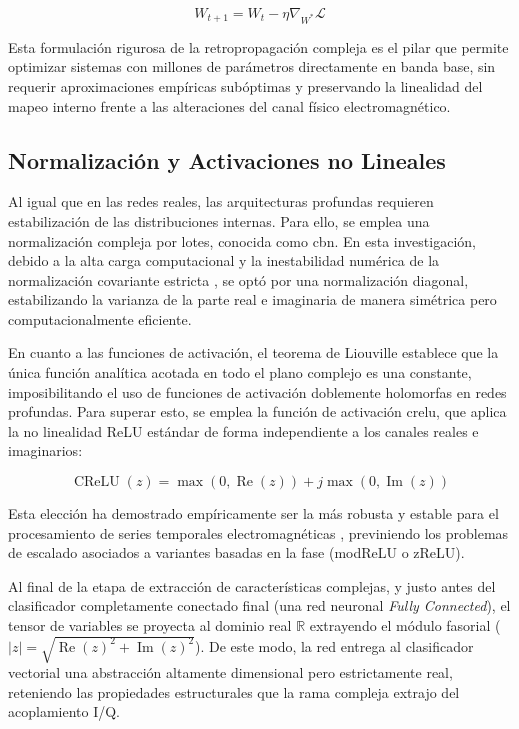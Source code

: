 \begin{equation}
    W_{t+1} = W_t - \eta \nabla_{W^*} \mathcal{L}
    \label{eq:complex_gradient_descent}
\end{equation}

Esta formulación rigurosa de la retropropagación compleja \cite{bouboulis_extension_2011} es el pilar que permite optimizar sistemas con millones de parámetros directamente en banda base, sin requerir aproximaciones empíricas subóptimas y preservando la linealidad del mapeo interno frente a las alteraciones del canal físico electromagnético.

\subsection{Normalización y Activaciones no Lineales}

Al igual que en las redes reales, las arquitecturas profundas requieren estabilización de las distribuciones internas. Para ello, se emplea una normalización compleja por lotes, conocida como \gls{cbn}. En esta investigación, debido a la alta carga computacional y la inestabilidad numérica de la normalización covariante estricta \cite{trabelsi_deep_2018}, se optó por una normalización diagonal, estabilizando la varianza de la parte real e imaginaria de manera simétrica pero computacionalmente eficiente.

En cuanto a las funciones de activación, el teorema de Liouville establece que la única función analítica acotada en todo el plano complejo es una constante, imposibilitando el uso de funciones de activación doblemente holomorfas en redes profundas. Para superar esto, se emplea la función de activación \gls{crelu}, que aplica la no linealidad ReLU estándar de forma independiente a los canales reales e imaginarios:

\begin{equation}
    \operatorname{CReLU}(z) = \max(0, \operatorname{Re}(z)) + j \max(0, \operatorname{Im}(z))
    \label{eq:crelu}
\end{equation}

Esta elección ha demostrado empíricamente ser la más robusta y estable para el procesamiento de series temporales electromagnéticas \cite{bassey_survey_2021}, previniendo los problemas de escalado asociados a variantes basadas en la fase (modReLU o zReLU).

Al final de la etapa de extracción de características complejas, y justo antes del clasificador completamente conectado final (una red neuronal \textit{Fully Connected}), el tensor de variables se proyecta al dominio real $\mathbb{R}$ extrayendo el módulo fasorial ($|z| = \sqrt{\operatorname{Re}(z)^2 + \operatorname{Im}(z)^2}$). De este modo, la red entrega al clasificador vectorial una abstracción altamente dimensional pero estrictamente real, reteniendo las propiedades estructurales que la rama compleja extrajo del acoplamiento I/Q.


